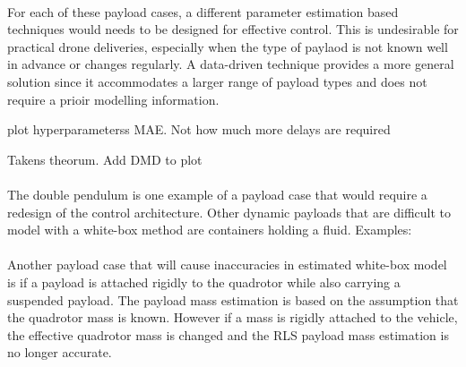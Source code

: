         

        \paragraph{}
        For each of these payload cases, a different parameter estimation based techniques would needs to be designed for effective control.
        This is undesirable for practical drone deliveries, especially when the type of paylaod is not known well in advance or changes regularly.
        A data-driven technique provides a more general solution since it accommodates a larger range of payload types and does not require a prioir modelling information.
        
        plot hyperparameterss MAE. Not how much more delays are required
        
        Takens theorum.
        Add DMD to plot
        

        \paragraph{}
        The double pendulum is one example of a payload case that would require a redesign of the control architecture.
        Other dynamic payloads that are difficult to model with a white-box method are containers holding a fluid.
        Examples: 

        \paragraph{}
        Another payload case that will cause inaccuracies in estimated white-box model 
        is if a payload is attached rigidly to the quadrotor while also carrying a suspended payload.
        The payload mass estimation is based on the assumption that the quadrotor mass is known.
        However if a mass is rigidly attached to the vehicle, the effective quadrotor mass is changed and the RLS payload mass estimation is no longer accurate.

